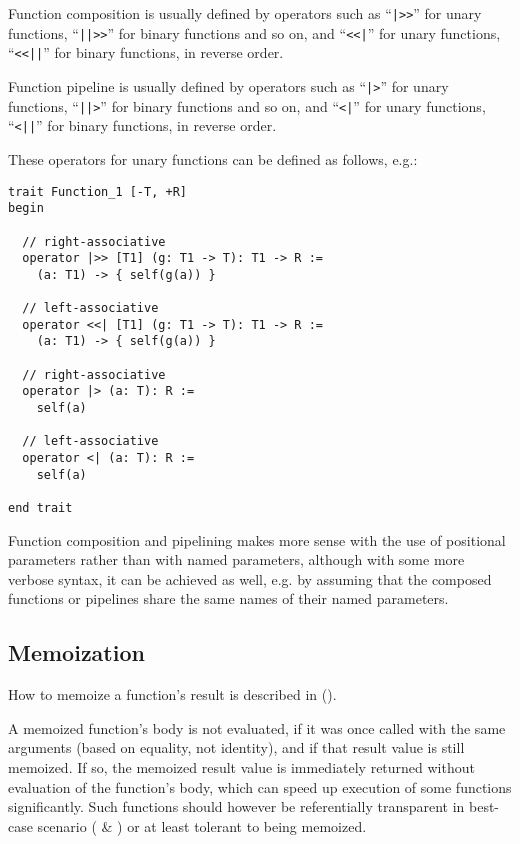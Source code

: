 Function composition is usually defined by operators such as ``\lstinline!|>>!'' for unary functions, ``\lstinline!||>>!'' for binary functions and so on, and ``\lstinline!<<|!'' for unary functions, ``\lstinline!<<||!'' for binary functions, in reverse order. 

Function pipeline is usually defined by operators such as ``\lstinline!|>!'' for unary functions, ``\lstinline!||>!'' for binary functions and so on, and ``\lstinline!<|!'' for unary functions, ``\lstinline!<||!'' for binary functions, in reverse order. 

These operators for unary functions can be defined as follows, e.g.:
\begin{lstlisting}
trait Function_1 [-T, +R]
begin

  // right-associative
  operator |>> [T1] (g: T1 -> T): T1 -> R := 
    (a: T1) -> { self(g(a)) }

  // left-associative
  operator <<| [T1] (g: T1 -> T): T1 -> R :=
    (a: T1) -> { self(g(a)) }

  // right-associative
  operator |> (a: T): R :=
    self(a)

  // left-associative
  operator <| (a: T): R := 
    self(a)
    
end trait
\end{lstlisting}

Function composition and pipelining makes more sense with the use of positional parameters rather than with named parameters, although with some more verbose syntax, it can be achieved as well, e.g. by assuming that the composed functions or pipelines share the same names of their named parameters. 





\subsection{Memoization}
\label{sec:memoization}

How to memoize a function's result is described in ().

A memoized function's body is not evaluated, if it was once called with the same arguments (based on equality, not identity), and if that result value is still memoized. If so, the memoized result value is immediately returned without evaluation of the function's body, which can speed up execution of some functions significantly. Such functions should however be referentially transparent in best-case scenario ( \& ) or at least tolerant to being memoized. 

